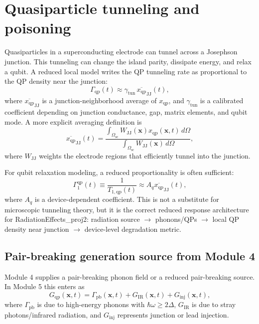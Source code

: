 \documentclass[11pt]{article}
\newcommand{\Om}{\Omega}
\newcommand{\Osc}{\Omega_{\mathrm{sc}}}
\newcommand{\x}{\bm{x}}
\newcommand{\xqp}{x_{\mathrm{qp}}}
\newcommand{\Gqp}{G_{\mathrm{qp}}}
\newcommand{\GammaQP}{\Gamma_{\mathrm{qp}}}
\newcommand{\GammaPB}{\Gamma_{\mathrm{pb}}}
\begin{document}
\section{Quasiparticle tunneling and poisoning}

Quasiparticles in a superconducting electrode can tunnel across a Josephson junction. This tunneling can change the island parity, dissipate energy, and relax a qubit. A reduced local model writes the QP tunneling rate as proportional to the QP density near the junction:
\begin{equation}
\GammaQP(t) \approx \gamma_{\mathrm{tun}}\,\overline{\xqp}_{\mathrm{JJ}}(t),
\label{eq:gamma_qp_reduced}
\end{equation}
where \(\overline{\xqp}_{\mathrm{JJ}}\) is a junction-neighborhood average of \(\xqp\), and \(\gamma_{\mathrm{tun}}\) is a calibrated coefficient depending on junction conductance, gap, matrix elements, and qubit mode. A more explicit averaging definition is
\begin{equation}
\overline{\xqp}_{\mathrm{JJ}}(t)=\frac{\int_{\Osc} W_{\mathrm{JJ}}(\x)\xqp(\x,t)\,d\Om}{\int_{\Osc} W_{\mathrm{JJ}}(\x)\,d\Om},
\end{equation}
where \(W_{\mathrm{JJ}}\) weights the electrode regions that efficiently tunnel into the junction.

For qubit relaxation modeling, a reduced proportionality is often sufficient:
\begin{equation}
\Gamma_1^{\mathrm{qp}}(t) \equiv \frac{1}{T_{1,\mathrm{qp}}(t)} \approx A_q \overline{\xqp}_{\mathrm{JJ}}(t),
\label{eq:t1_qp}
\end{equation}
where \(A_q\) is a device-dependent coefficient. This is not a substitute for microscopic tunneling theory, but it is the correct reduced response architecture for RadiationEffects\_proj2: radiation source \(\rightarrow\) phonons/QPs \(\rightarrow\) local QP density near junction \(\rightarrow\) device-level degradation metric.

\subsection{Pair-breaking generation source from Module 4}

Module 4 supplies a pair-breaking phonon field or a reduced pair-breaking source. In Module 5 this enters as
\begin{equation}
\Gqp(\x,t)=\GammaPB(\x,t)+G_{\mathrm{IR}}(\x,t)+G_{\mathrm{inj}}(\x,t),
\end{equation}
where \(\GammaPB\) is due to high-energy phonons with \(\hbar\omega\ge 2\Delta\), \(G_{\mathrm{IR}}\) is due to stray photons/infrared radiation, and \(G_{\mathrm{inj}}\) represents junction or lead injection.
\end{document}
